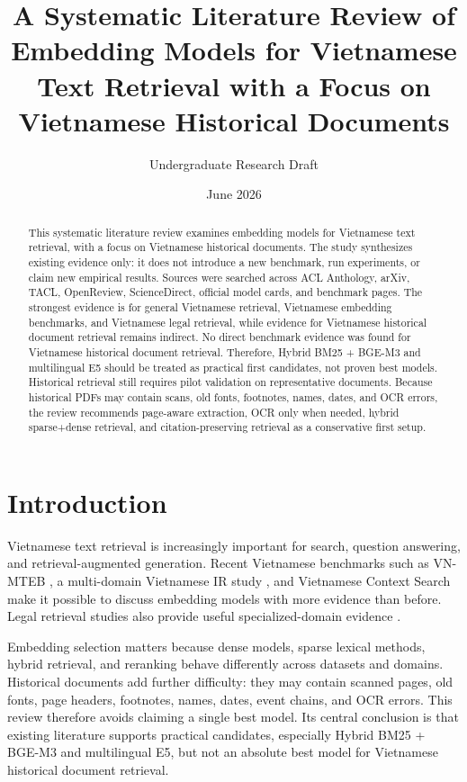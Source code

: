 \documentclass[11pt]{article}
\title{A Systematic Literature Review of Embedding Models for Vietnamese Text Retrieval with a Focus on Vietnamese Historical Documents}
\author{Undergraduate Research Draft}
\date{June 2026}
\begin{document}
\maketitle

\begin{abstract}
This systematic literature review examines embedding models for Vietnamese text retrieval, with a focus on Vietnamese historical documents. The study synthesizes existing evidence only: it does not introduce a new benchmark, run experiments, or claim new empirical results. Sources were searched across ACL Anthology, arXiv, TACL, OpenReview, ScienceDirect, official model cards, and benchmark pages. The strongest evidence is for general Vietnamese retrieval, Vietnamese embedding benchmarks, and Vietnamese legal retrieval, while evidence for Vietnamese historical document retrieval remains indirect. No direct benchmark evidence was found for Vietnamese historical document retrieval. Therefore, Hybrid BM25 + BGE-M3 and multilingual E5 should be treated as practical first candidates, not proven best models. Historical retrieval still requires pilot validation on representative documents. Because historical PDFs may contain scans, old fonts, footnotes, names, dates, and OCR errors, the review recommends page-aware extraction, OCR only when needed, hybrid sparse+dense retrieval, and citation-preserving retrieval as a conservative first setup.
\end{abstract}

\section{Introduction}
Vietnamese text retrieval is increasingly important for search, question answering, and retrieval-augmented generation. Recent Vietnamese benchmarks such as VN-MTEB \cite{pham-etal-2026-vn}, a multi-domain Vietnamese IR study \cite{nguyen-quan-2026-works}, and Vietnamese Context Search \cite{nguyen-etal-2024-advancing} make it possible to discuss embedding models with more evidence than before. Legal retrieval studies also provide useful specialized-domain evidence \cite{khang-etal-2024-vietnamese-legal,nguyen-etal-2025-improving,ba-etal-2024-vietnamese-legal-ir}.

Embedding selection matters because dense models, sparse lexical methods, hybrid retrieval, and reranking behave differently across datasets and domains. Historical documents add further difficulty: they may contain scanned pages, old fonts, page headers, footnotes, names, dates, event chains, and OCR errors. This review therefore avoids claiming a single best model. Its central conclusion is that existing literature supports practical candidates, especially Hybrid BM25 + BGE-M3 and multilingual E5, but not an absolute best model for Vietnamese historical document retrieval.
\end{document}
